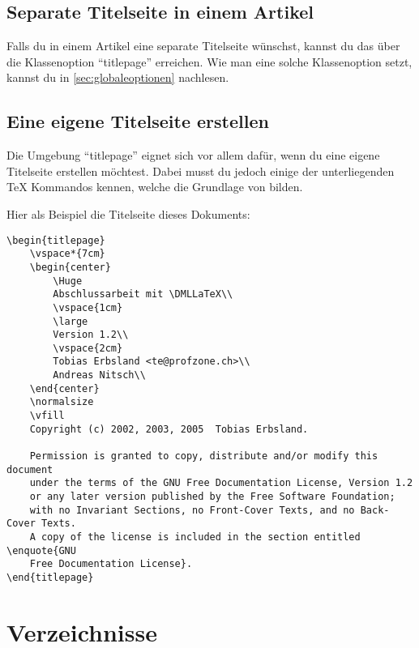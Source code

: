 \subsection{Separate Titelseite in einem Artikel}
\label{sec:separatetitelseite}

Falls du in einem Artikel eine separate Titelseite wünschst, kannst du das über die Klassenoption \enquote{titlepage} erreichen. Wie man eine solche Klassenoption setzt, kannst du in \cref{sec:globaleoptionen} nachlesen.

\subsection{Eine eigene Titelseite erstellen}

Die Umgebung \enquote{titlepage} eignet sich vor allem dafür, wenn du eine eigene Titelseite erstellen möchtest. Dabei musst du jedoch einige der unterliegenden {\rmfamily\TeX} Kommandos kennen, welche die Grundlage von \DMLLaTeX{} bilden.

Hier als Beispiel die Titelseite dieses Dokuments:
\begin{lstlisting}[frame=tb, caption=Titelseite dieses Dokuments]
\begin{titlepage}
	\vspace*{7cm}
	\begin{center}
		\Huge
		Abschlussarbeit mit \DMLLaTeX\\
		\vspace{1cm}
		\large
		Version 1.2\\
		\vspace{2cm}
		Tobias Erbsland <te@profzone.ch>\\
		Andreas Nitsch\\
	\end{center}
	\normalsize
	\vfill
	Copyright (c) 2002, 2003, 2005  Tobias Erbsland.

	Permission is granted to copy, distribute and/or modify this document
	under the terms of the GNU Free Documentation License, Version 1.2
	or any later version published by the Free Software Foundation;
	with no Invariant Sections, no Front-Cover Texts, and no Back-Cover Texts.
	A copy of the license is included in the section entitled \enquote{GNU
	Free Documentation License}.
\end{titlepage}
\end{lstlisting}

\section{Verzeichnisse}

